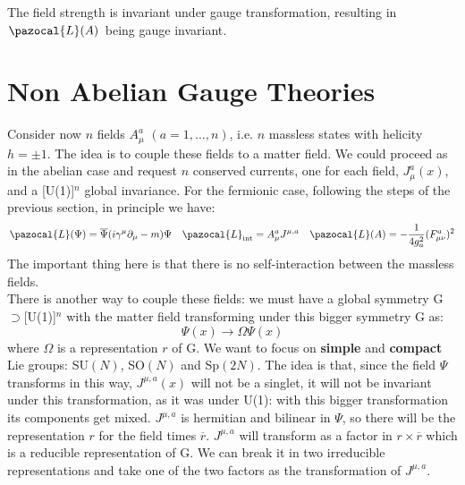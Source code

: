 \documentclass[../main.tex]{subfiles}
\begin{document}
The field strength is invariant under gauge transformation, resulting in $\pazocal{L}(A)$ being gauge invariant. 
\section{Non Abelian Gauge Theories}
Consider now $n$ fields $A_\mu^a$ $(a=1,\dots,n)$, i.e. $n$ massless states with helicity $h=\pm1$. The idea is to couple these fields to a matter field. We could proceed as in the abelian case and request $n$ conserved currents, one for each field, $J_\mu^a(x)$, and a [U(1)]$^n$ global invariance. For the fermionic case, following the steps of the previous section, in principle we have:
\[
\pazocal{L}(\Psi)=\overline{\Psi}(i\gamma^\mu\partial_\mu-m)\Psi \quad \pazocal{L}_{\text{int}}=A_\mu^a J^{\mu,a} \quad \pazocal{L}(A)=-\frac{1}{4g_a^2}(F_{\mu\nu}^a)^2
\]
The important thing here is that there is no self-interaction between the massless fields.\\
There is another way to couple these fields: we must have a global symmetry G$\supset$[U(1)]$^n$ with the matter field transforming under this bigger symmetry G as:
\[
\Psi(x)\to\Omega\Psi(x)
\]
where $\Omega$ is a representation $r$ of G. We want to focus on \textbf{simple} and \textbf{compact} Lie groups: SU$(N)$, SO$(N)$ and  Sp$(2N)$. The idea is that, since the field $\Psi$ transforms in this way, $J^{\mu,a}(x)$ will not be a singlet, it will not be invariant under this transformation, as it was under U(1): with this bigger transformation its components get mixed. $J^{\mu,a}$ is hermitian and bilinear in $\Psi$, so there will be the representation $r$ for the field times $\overline{r}$. $J^{\mu,a}$ will transform as a factor in $r\times\overline{r}$ which is a reducible representation of G. We can break it in two irreducible representations and take one of the two factors as the transformation of $J^{\mu,a}$.
\end{document}
